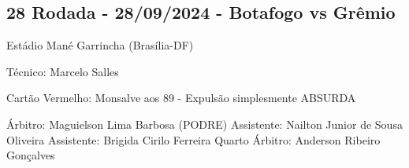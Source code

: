 \newpage
\subsection{28 Rodada - 28/09/2024 - Botafogo vs Grêmio}

\begin{figure}[H]
    \centering
    
\end{figure}

Estádio Mané Garrincha (Brasília-DF)

Técnico: Marcelo Salles

Cartão Vermelho: Monsalve aos 89 - Expulsão simplesmente ABSURDA

Árbitro: Maguielson Lima Barbosa (PODRE)
Assistente: Nailton Junior de Sousa Oliveira
Assistente: Brigida Cirilo Ferreira
Quarto Árbitro: Anderson Ribeiro Gonçalves